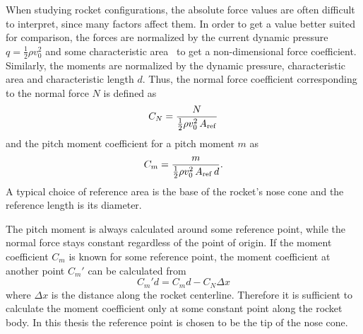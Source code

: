 When studying rocket configurations, the absolute force values are
often difficult to interpret, since many factors affect them.  In
order to get a value better suited for comparison, the forces are
normalized by the current dynamic pressure $q=\frac{1}{2}\rho v_0^2$
and some characteristic area \Aref\ to get a non-dimensional force
coefficient. Similarly, the moments are normalized by the dynamic
pressure, characteristic area and characteristic length $d$.  Thus,
the normal force coefficient corresponding to the normal force $N$ is
defined as
%
\begin{equation}
C_N  =  \frac{N}{\frac{1}{2}\rho v_0^2 \, A_{\rm ref}} 
\label{eq-CN-def}
\end{equation}
%
and the pitch moment coefficient for a pitch moment $m$ as
%
\begin{equation}
C_m  =  \frac{m}{\frac{1}{2}\rho v_0^2 \, A_{\rm ref}\, d}.
\label{eq-Cm-def}
\end{equation}
%
A typical choice of reference area is the base of the rocket's nose
cone and the reference length is its diameter.

The pitch moment is always calculated around some reference point,
while the normal force stays constant regardless of the point of
origin.  If the moment coefficient $C_m$ is known for some reference
point, the moment coefficient at another point $C_m'$ can be
calculated from
%
\begin{equation}
C_m'd = C_md - C_N\Delta x
\label{eq-moment-reference}
\end{equation}
%
where $\Delta x$ is the distance along the rocket centerline.
Therefore it is sufficient to calculate the moment coefficient only at
some constant point along the rocket body.  In this thesis the
reference point is chosen to be the tip of the nose cone.

